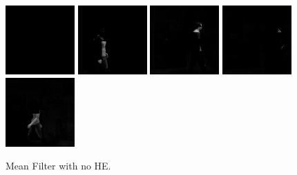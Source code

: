     \begin{subfigure}[t]{0.9\textwidth}
        \centering
        \includegraphics[scale=0.7]{figures/LASIESTA-PLAIN-MEAN/frame0}
        \hfill
        \includegraphics[scale=0.7]{figures/LASIESTA-PLAIN-MEAN/frame100}
        \hfill
        \includegraphics[scale=0.7]{figures/LASIESTA-PLAIN-MEAN/frame190}
        \hfill
        \includegraphics[scale=0.7]{figures/LASIESTA-PLAIN-MEAN/frame250}
        \hfill
        \includegraphics[scale=0.7]{figures/LASIESTA-PLAIN-MEAN/frame270}
        \caption{Mean Filter with no HE.}
    \end{subfigure}
    \\ \bigskip
